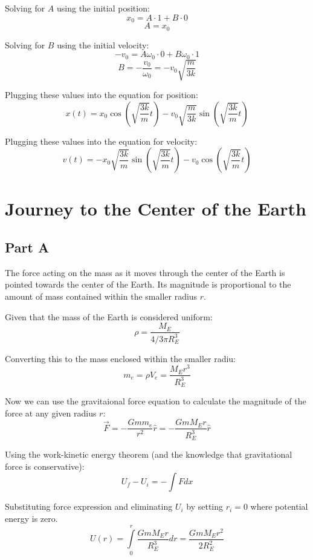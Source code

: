 \documentclass{article}
\begin{document}
Solving for $A$ using the initial position:
$$ x_{0} = A \cdot 1 + B \cdot 0 $$
$$ A = x_{0} $$

Solving for $B$ using the initial velocity:
$$ -v_{0} = A \omega_{0} \cdot 0 + B \omega_{0} \cdot 1 $$
$$ B = -\frac{ v_{0} }{ \omega_{0} } = -v_{0} \sqrt{ \frac{ m }{ 3k } } $$

Plugging these values into the equation for position:
$$ x( t ) = x_{0} \cos \left( \sqrt{ \frac{ 3k }{ m } } t \right) - v_{0} \sqrt{
\frac{ m }{ 3k } } \sin \left( \sqrt{ \frac{ 3k }{ m } } t \right) $$

Plugging these values into the equation for velocity:
$$ v( t ) = -x_{0} \sqrt{ \frac{ 3k }{ m } } \sin \left( \sqrt{ \frac{ 3k }{ m }
} t \right) - v_{0} \cos \left( \sqrt{ \frac{ 3k }{ m } } t \right) $$

\section{ Journey to the Center of the Earth }

\subsection*{ Part A }

The force acting on the mass as it moves through the center of the Earth is
pointed towards the center of the Earth. Its magnitude is proportional to the
amount of mass contained within the smaller radius $r$.

\bigbreak

Given that the mass of the Earth is considered uniform:
$$ \rho = \frac{ M_{E} }{ 4/3 \pi R_{E}^{3} } $$

Converting this to the mass enclosed within the smaller radiu:
$$ m_{e} = \rho V_{e} = \frac{ M_{E} r^{3} }{ R_{E}^{3} } $$

Now we can use the gravitaional force equation to calculate the magnitude of the
force at any given radius $r$:
$$ \vec{ F } = -\frac{ G m m_{e} }{ r^{2} } \hat{ r } = -\frac{ G m M_{E} r }{
R_{E}^{3} } \hat{ r } $$

Using the work-kinetic energy theorem (and the knowledge that gravitational
force is conservative):
$$ U_{f} - U_{i} = - \int F dx $$

Substituting force expression and eliminating $U_{i}$ by setting $r_{i} = 0$
where potential energy is zero.
$$ U( r ) = \int \limits_{0}^{r} \frac{ G m M_{E} r }{ R_{E}^{3} } dr = \frac{ G
m M_{E} r^{2} }{ 2 R_{E}^{2} }$$
\end{document}
